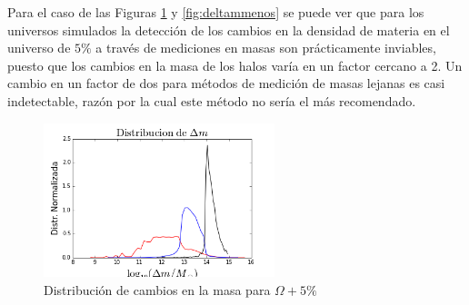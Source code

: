 Para el caso de las Figuras \ref{fig:deltammas} y \ref{fig:deltammenos} se puede ver que para los universos simulados la detección de los cambios en la densidad de materia en el universo de $5\%$ a través de mediciones en masas son prácticamente inviables, puesto que los cambios en la masa de los halos varía en un factor cercano a 2. Un cambio en un factor de dos para métodos de medición de masas lejanas es casi indetectable, razón por la cual este método no sería el más recomendado.

\begin{figure}[h]
\centering
\includegraphics[width=0.6\textwidth]{Trabajo/deltammas}
\caption{Distribución de cambios en la masa para $\Omega+5\%$}
\label{fig:deltammas}
\end{figure}
